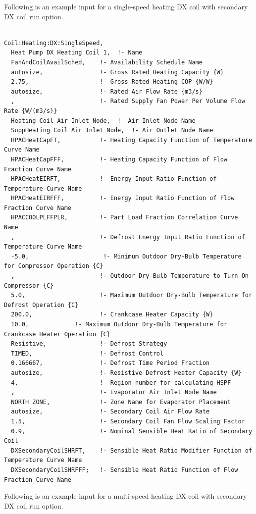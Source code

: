 Following is an example input for a single-speed heating DX coil with secondary DX coil run option.

\begin{lstlisting}

Coil:Heating:DX:SingleSpeed,
  Heat Pump DX Heating Coil 1,  !- Name
  FanAndCoilAvailSched,    !- Availability Schedule Name
  autosize,                !- Gross Rated Heating Capacity {W}
  2.75,                    !- Gross Rated Heating COP {W/W}
  autosize,                !- Rated Air Flow Rate {m3/s}
  ,                        !- Rated Supply Fan Power Per Volume Flow Rate {W/(m3/s)}
  Heating Coil Air Inlet Node,  !- Air Inlet Node Name
  SuppHeating Coil Air Inlet Node,  !- Air Outlet Node Name
  HPACHeatCapFT,           !- Heating Capacity Function of Temperature Curve Name
  HPACHeatCapFFF,          !- Heating Capacity Function of Flow Fraction Curve Name
  HPACHeatEIRFT,           !- Energy Input Ratio Function of Temperature Curve Name
  HPACHeatEIRFFF,          !- Energy Input Ratio Function of Flow Fraction Curve Name
  HPACCOOLPLFFPLR,         !- Part Load Fraction Correlation Curve Name
  ,                        !- Defrost Energy Input Ratio Function of Temperature Curve Name
  -5.0,                     !- Minimum Outdoor Dry-Bulb Temperature for Compressor Operation {C}
  ,                        !- Outdoor Dry-Bulb Temperature to Turn On Compressor {C}
  5.0,                     !- Maximum Outdoor Dry-Bulb Temperature for Defrost Operation {C}
  200.0,                   !- Crankcase Heater Capacity {W}
  10.0,             !- Maximum Outdoor Dry-Bulb Temperature for Crankcase Heater Operation {C}
  Resistive,               !- Defrost Strategy
  TIMED,                   !- Defrost Control
  0.166667,                !- Defrost Time Period Fraction
  autosize,                !- Resistive Defrost Heater Capacity {W}
  4,                       !- Region number for calculating HSPF
  ,                        !- Evaporator Air Inlet Node Name
  NORTH ZONE,              !- Zone Name for Evaporator Placement
  autosize,                !- Secondary Coil Air Flow Rate
  1.5,                     !- Secondary Coil Fan Flow Scaling Factor
  0.9,                     !- Nominal Sensible Heat Ratio of Secondary Coil
  DXSecondaryCoilSHRFT,    !- Sensible Heat Ratio Modifier Function of Temperature Curve Name
  DXSecondaryCoilSHRFFF;   !- Sensible Heat Ratio Function of Flow Fraction Curve Name
\end{lstlisting}

Following is an example input for a multi-speed heating DX coil with secondary DX coil run option.

